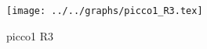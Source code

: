 \begin{figure}[h] \centering\texttt{[image: ../../graphs/picco1\_R3.tex]}\caption{picco1 R3}\label{gr:picco1_R3} \end{figure}
